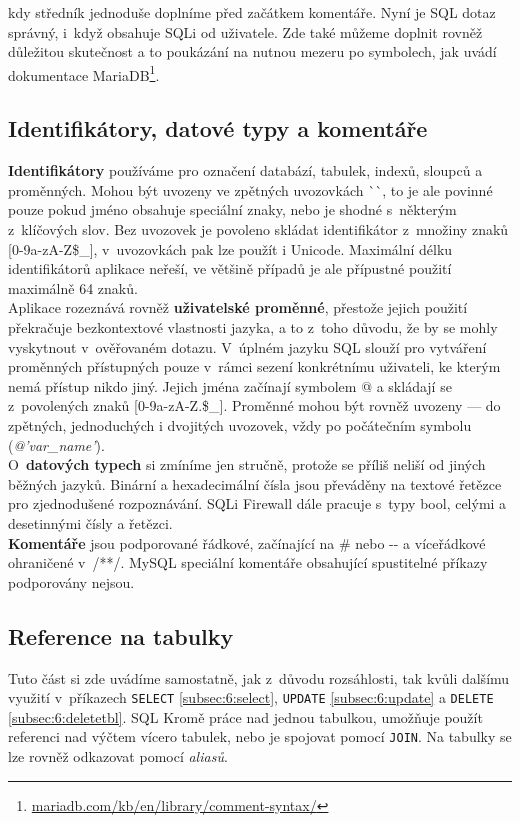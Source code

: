kdy středník jednoduše doplníme před začátkem komentáře. Nyní je SQL dotaz správný, i~když obsahuje SQLi od uživatele.
Zde také můžeme doplnit rovněž důležitou skutečnost a to poukázání na nutnou mezeru po \uv{-{}-} symbolech, jak uvádí dokumentace 
MariaDB\footnote{\url{mariadb.com/kb/en/library/comment-syntax/}}.

\subsection{Identifikátory, datové typy a komentáře} \label{subsec:6:identifier}
\textbf{Identifikátory} používáme pro označení databází, tabulek, indexů, sloupců a proměnných. Mohou být uvozeny ve zpětných uvozovkách 
\`{}\`{}, to je ale povinné pouze pokud jméno obsahuje speciální znaky, nebo je shodné s~některým z~klíčových slov.
Bez uvozovek je povoleno skládat identifikátor z~množiny znaků [0-9a-zA-Z\$\_], v~uvozovkách pak lze použít i Unicode.
Maximální délku identifikátorů aplikace neřeší, ve většině případů je ale přípustné použití maximálně 64 znaků. \\

Aplikace rozeznává rovněž \textbf{uživatelské proměnné}, přestože jejich použití překračuje bezkontextové vlastnosti jazyka, a to z~toho důvodu, že by
se mohly vyskytnout v~ověřovaném dotazu. V~úplném jazyku SQL slouží pro vytváření proměnných přístupných pouze v~rámci sezení konkrétnímu uživateli, 
ke kterým nemá přístup nikdo jiný. Jejich jména začínají symbolem @ a skládají se z~povolených znaků [0-9a-zA-Z.\$\_]. Proměnné mohou být rovněž
uvozeny --- do zpětných, jednoduchých i dvojitých uvozovek, vždy po počátečním symbolu (\textit{@'var\_name'}). \\

O~\textbf{datových typech} si zmíníme jen stručně, protože se příliš neliší od jiných běžných jazyků. Binární a hexadecimální čísla jsou převáděny
na textové řetězce pro zjednodušené rozpoznávání. SQLi Firewall dále pracuje s~typy bool, celými a desetinnými čísly a řetězci. \\

\textbf{Komentáře} jsou podporované řádkové, začínající na \# nebo -{}- a víceřádkové ohraničené v~/**/. MySQL speciální komentáře obsahující
spustitelné příkazy podporovány nejsou.

\subsection{Reference na tabulky} \label{subsec:6:tblref}
Tuto část si zde uvádíme samostatně, jak z~důvodu rozsáhlosti, tak kvůli dalšímu využití v~příkazech \texttt{SELECT} \ref{subsec:6:select}, 
\texttt{UPDATE} \ref{subsec:6:update} a \texttt{DELETE} \ref{subsec:6:deletetbl}. SQL Kromě práce nad jednou tabulkou, umožňuje použít referenci 
nad výčtem vícero tabulek, nebo je spojovat pomocí \texttt{JOIN}. Na tabulky se lze rovněž odkazovat pomocí \textit{aliasů}. \\


